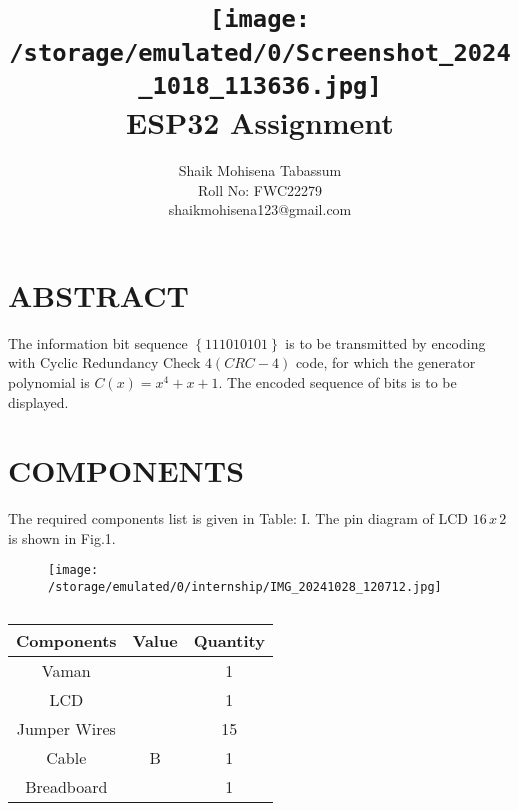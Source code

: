 \documentclass[conference]{IEEEtran}
\title{
\vspace{1cm}
{\texttt{[image: /storage/emulated/0/Screenshot\_2024\_1018\_113636.jpg]} \\ ESP32 Assignment} }
\author{Shaik Mohisena Tabassum \\ Roll No: FWC22279 \\ shaikmohisena123@gmail.com}
\providecommand{\cbrak}[1]{\ensuremath{\left\{#1\right\}}}
\providecommand{\brak}[1]{\ensuremath{\left(#1\right)}}
\begin{document}
\maketitle
 \section {ABSTRACT}
 The information bit sequence 
$ \cbrak{111010101}$
 is to be transmitted by encoding with Cyclic Redundancy Check $4 \brak{CRC-4}$ code, for which the generator polynomial is $ C(x) = x^4 + x + 1$. The encoded sequence of bits is to be displayed.
\section{COMPONENTS}
The required components list is given in Table: I. The pin diagram of LCD $16\,x\,2$ is shown in Fig.1.
\begin{figure}[h]
\centering
\texttt{[image: /storage/emulated/0/internship/IMG\_20241028\_120712.jpg]}
\caption{\label{fig:Gates}}
\end{figure}
 \begin{table} [htbp]
\centering
\begin{tabular}{| c | c | c |} \hline
Components & Value & Quantity \\\hline
	Vaman &  & 1 \\ \hline
	LCD &  & 1 \\ \hline
Jumper Wires &  & 15 \\ \hline
Cable & B & 1 \\ \hline
Breadboard & & 1 \\ 
\hline
\end{tabular}
\vspace{0.1cm}
\caption{\label{tab:widgets}}
\end{table}
\end{document}
